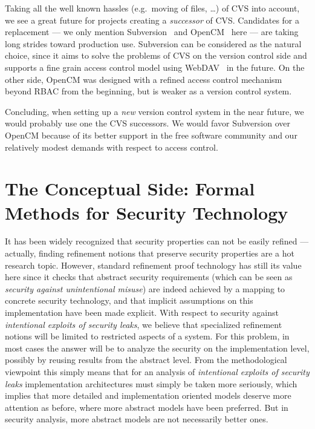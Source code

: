 Taking all the well known hassles (e.g.\ moving of files, \ldots) of CVS into
account, we see a great future for projects creating a \emph{successor} of
CVS\@. Candidates for a replacement --- we only mention
Subversion~\cite{subversion} and OpenCM~\cite{opencm} here --- are taking long
strides toward production use. Subversion can be considered as the natural choice,
since it aims to solve the problems of CVS on the version control side
and supports a fine grain access control model using WebDAV~\cite{} in the future.
On the other side, OpenCM was designed with a refined access control mechanism
beyond RBAC from the beginning, but is weaker as a version control system.

Concluding, when setting up a \emph{new} version control system in the near
future, we would probably use one the CVS successors. We would favor
Subversion over OpenCM because of its better support in the free software
community and our relatively modest demands with respect to access
control.

\section{The Conceptual Side: Formal Methods for Security Technology}

It has been widely recognized that security properties can not be easily refined
--- actually, finding refinement notions that preserve security properties are a
hot research topic. However, standard refinement proof technology has still its
value here since it checks that abstract security requirements (which can be
seen as \emph{security against unintentional misuse}) are indeed achieved by a
mapping to concrete security technology, and that implicit assumptions on this
implementation have been made explicit. With respect to security against
\emph{intentional exploits of security leaks}, we believe that specialized
refinement notions will be limited to restricted aspects of a system. For this
problem, in most cases the answer will be to analyze the security on the
implementation level, possibly by reusing results from the abstract level. From
the methodological viewpoint this simply means that for an analysis of
\emph{intentional exploits of security leaks} implementation architectures must
simply be taken more seriously, which implies that more detailed and
implementation oriented models deserve more attention as before, where more
abstract models have been preferred. But in security analysis, more abstract
models are not necessarily better ones.


